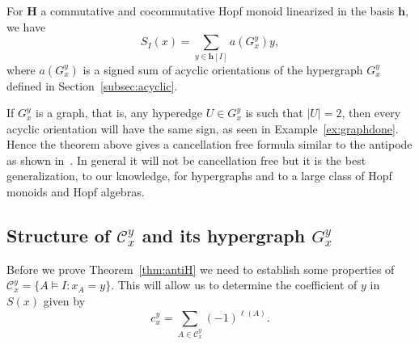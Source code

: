\documentclass[ALCO,ThmDefs,Unicode,epreuves]{cedram}
\newcommand{\bH}{\mathbf{H}}
\newcommand{\bh}{\mathbf{h}}
\begin{document}
\begin{theorem}\label{thm:antiH} For $\bH$ a commutative and cocommutative Hopf monoid linearized in the basis $\bh$, we have
 \begin{equation}\label{eq:thm2}
 S_I(x) = \sum_{y\in \bh[I]} a(G_x^y) y,
\end{equation}
where $a(G_x^y)$ is a signed sum of acyclic orientations of the hypergraph $G_x^y$ defined in Section~\ref{subsec:acyclic}.
\end{theorem}

\begin{rema}
If $G_x^y$ is a graph, that is, any hyperedge $U\in G_x^y$ is such that $|U|=2$, then every acyclic orientation will have the same sign, as seen in Example~\ref{ex:graphdone}. 
Hence the theorem above gives a
cancellation free formula similar to the antipode as shown in~\cite{Humpert-Martin}. In general it will not be cancellation free but it is the best generalization, to our knowledge,
for hypergraphs and to a large class of Hopf monoids and Hopf algebras. \end{rema}

\subsection{Structure of \texorpdfstring{$\mathcal{C}_{x}^{y}$}{Cxy} and its hypergraph \texorpdfstring{$G_x^y$}{Gxy}}
Before we prove Theorem~\ref{thm:antiH} we need to establish some properties of $\mathcal{C}_{x}^{y}=\big\{A\models I : x_A=y\big\}$. This will allow us to determine the coefficient of $y$ in $S(x)$ given by
\begin{equation} \label{eq:cxycocom}
 c_x^y=\sum_{A\in \mathcal{C}_{x}^{y}} (-1)^{\ell(A)}.
 \end{equation}
\end{document}
